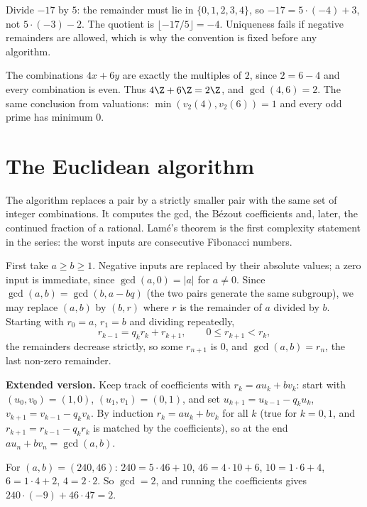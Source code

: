 \begin{examplex}
Divide $-17$ by $5$: the remainder must lie in $\{0,1,2,3,4\}$, so $-17=5\cdot(-4)+3$, not $5\cdot(-3)-2$. The quotient is $\lfloor -17/5\rfloor=-4$. Uniqueness fails if negative remainders are allowed, which is why the convention is fixed before any algorithm.
\end{examplex}

\begin{examplex}
The combinations $4x+6y$ are exactly the multiples of $2$, since $2=6-4$ and every combination is even. Thus $4\Z+6\Z=2\Z$, and $\gcd(4,6)=2$. The same conclusion from valuations: $\min(v_2(4),v_2(6))=1$ and every odd prime has minimum $0$.
\end{examplex}

\section{The Euclidean algorithm}

The algorithm replaces a pair by a strictly smaller pair with the same set of integer combinations. It computes the gcd, the Bézout coefficients and, later, the continued fraction of a rational. Lamé's theorem is the first complexity statement in the series: the worst inputs are consecutive Fibonacci numbers.

First take $a\ge b\ge1$. Negative inputs are replaced by their absolute values; a zero input is immediate, since $\gcd(a,0)=|a|$ for $a\ne0$. Since $\gcd(a,b)=\gcd(b,a-bq)$ (the two pairs generate the same subgroup), we may replace $(a,b)$ by $(b,r)$ where $r$ is the remainder of $a$ divided by $b$. Starting with $r_0=a$, $r_1=b$ and dividing repeatedly,
\[
r_{k-1}=q_kr_k+r_{k+1},\qquad0\le r_{k+1}<r_k,
\]
the remainders decrease strictly, so some $r_{n+1}$ is $0$, and $\gcd(a,b)=r_n$, the last non-zero remainder.

\textbf{Extended version.} Keep track of coefficients with $r_k=au_k+bv_k$: start with $(u_0,v_0)=(1,0)$, $(u_1,v_1)=(0,1)$, and set $u_{k+1}=u_{k-1}-q_ku_k$, $v_{k+1}=v_{k-1}-q_kv_k$. By induction $r_k=au_k+bv_k$ for all $k$ (true for $k=0,1$, and $r_{k+1}=r_{k-1}-q_kr_k$ is matched by the coefficients), so at the end $au_n+bv_n=\gcd(a,b)$.

\begin{example}
For $(a,b)=(240,46)$: $240=5\cdot46+10$, $46=4\cdot10+6$, $10=1\cdot6+4$, $6=1\cdot4+2$, $4=2\cdot2$. So $\gcd=2$, and running the coefficients gives $240\cdot(-9)+46\cdot47=2$.
\end{example}

